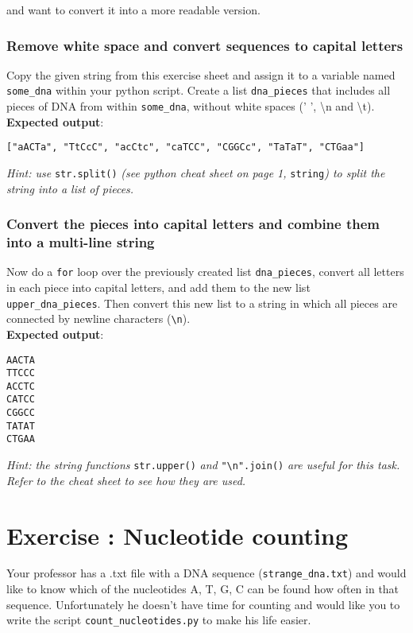\documentclass[12pt]{article}
\begin{document}
\noindent and want to convert it into a more readable version.

\subsubsection{Remove white space and convert sequences to capital letters}
Copy the given string from this exercise sheet and assign it to a variable named \verb|some_dna| within your python script. Create a list \verb|dna_pieces| that includes all pieces of DNA from within \verb|some_dna|, without white spaces (' ', \textbackslash n and \textbackslash t).\\

\noindent\textbf{Expected output}:
\begin{verbatim}
["aACTa", "TtCcC", "acCtc", "caTCC", "CGGCc", "TaTaT", "CTGaa"]
\end{verbatim}

\noindent\emph{Hint: use} \verb|str.split()| \emph{(see python cheat sheet on page 1,} \texttt{string}\emph{) to split the string into a list of pieces.}

\subsubsection{Convert the pieces into capital letters and combine them into a multi-line string}
Now do a \texttt{for} loop over the previously created list \verb|dna_pieces|, convert all letters in each piece into capital letters, and add them to the new list \verb|upper_dna_pieces|. Then convert this new list to a string in which all pieces are connected by newline characters (\verb|\n|).\\

\noindent\textbf{Expected output}:
\begin{verbatim}
AACTA
TTCCC
ACCTC
CATCC
CGGCC
TATAT
CTGAA
\end{verbatim}

\noindent\emph{Hint: the string functions} \verb|str.upper()| \emph{and} \verb|"\n".join()| \emph{are useful for this task. Refer to the cheat sheet to see how they are used.}


\section{Exercise : Nucleotide counting}
Your professor has a .txt file with a DNA sequence (\verb|strange_dna.txt|) and would like to know which of the nucleotides A, T, G, C can be found how often in that sequence. Unfortunately he doesn't have time for counting and would like you to write the script \verb|count_nucleotides.py| to make his life easier.
\end{document}
